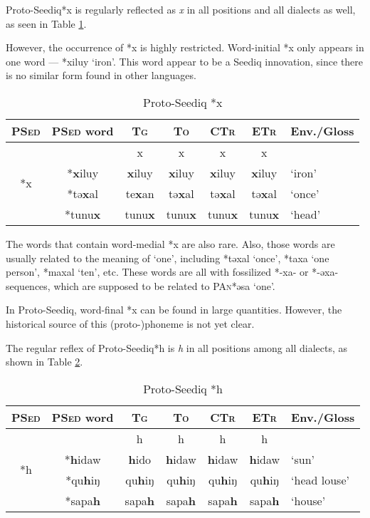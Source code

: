 \documentclass[12pt]{article}
\newcommand{\pan}{\textsc{PAn}\xspace}
\newcommand{\psed}{\textsc{PSed}\xspace}
\newcommand{\psedf}{Proto-Seediq\xspace}
\newcommand{\stg}{\textsc{Tg}\xspace}
\newcommand{\sto}{\textsc{To}\xspace}
\newcommand{\sctr}{\textsc{CTr}\xspace}
\newcommand{\setr}{\textsc{ETr}\xspace}
\begin{document}
\psedf *x is regularly reflected as \textit{x} in all positions and all dialects as well, as seen in Table \ref{tab:x}. 

However, the occurrence of *x is highly restricted. Word-initial *x only appears in one word --- *xiluy `iron'. This word appear to be a Seediq innovation, since there is no similar form found in other languages. 

\begin{table}[!htbp]
\centering
\caption{Proto-Seediq *x}
\label{tab:x}
\begin{tabular}{c|c|cccc|l}
\textbf{\psed} & \textbf{\psed word}      & \textbf{\stg} & \textbf{\sto} & \textbf{\sctr} & \textbf{\setr} & \multicolumn{1}{c}{\textbf{Env./Gloss}} \\ \hline
\multirow{4}{*}{*x} & & x & x & x & x &  \\ \cline{2-7}
                    & *\textbf{x}iluy & \textbf{x}iluy & \textbf{x}iluy & \textbf{x}iluy & \textbf{x}iluy & `iron' \\
                    & *tə\textbf{x}al & te\textbf{x}an & tə\textbf{x}al & tə\textbf{x}al & tə\textbf{x}al & `once' \\
                    & *tunu\textbf{x} & tunu\textbf{x} & tunu\textbf{x} & tunu\textbf{x} & tunu\textbf{x}  & `head' \\  \hline
\end{tabular}
\end{table}


The words that contain word-medial *x are also rare. Also, those words are usually related to the meaning of `one', including *təxal `once', *taxa `one person', *maxal `ten', etc. These words are all with fossilized *-xa- or *-əxa- sequences, which are supposed to be related to \pan *əsa `one'. 

In \psedf, word-final *x can be found in large quantities. However, the historical source of this (proto-)phoneme is not yet clear. 

The regular reflex of \psedf *h is \textit{h} in all positions among all dialects, as shown in Table \ref{tab:h}.

\begin{table}[!htbp]
\centering
\caption{Proto-Seediq *h}
\label{tab:h}
\begin{tabular}{c|c|cccc|l}
\textbf{\psed} & \textbf{\psed word}      & \textbf{\stg} & \textbf{\sto} & \textbf{\sctr} & \textbf{\setr} & \multicolumn{1}{c}{\textbf{Env./Gloss}} \\ \hline
\multirow{4}{*}{*h} & & h & h & h & h &  \\ \cline{2-7}
                    & *\textbf{h}idaw & \textbf{h}ido & \textbf{h}idaw & \textbf{h}idaw & \textbf{h}idaw & `sun' \\
                    & *qu\textbf{h}iŋ & qu\textbf{h}iŋ & qu\textbf{h}iŋ & qu\textbf{h}iŋ & qu\textbf{h}iŋ & `head louse' \\
                    & *sapa\textbf{h} & sapa\textbf{h} & sapa\textbf{h} & sapa\textbf{h} & sapa\textbf{h} & `house' \\ \hline
\end{tabular}
\end{table}
\end{document}
